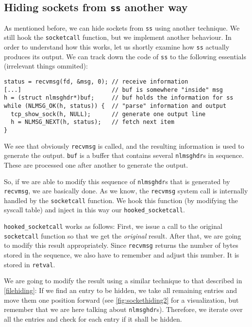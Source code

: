 \documentclass[10pt, letterpaper]{scrartcl}
\begin{document}
\subsection{Hiding sockets from \texttt{ss} another way}
\label{sec:socket-hiding-evasion}

As mentioned before, we can hide sockets from \texttt{ss} using another technique. We still hook the \texttt{socketcall} function, but we implement another behaviour. In order to understand how this works, let us shortly examine how \texttt{ss} actually produces its output. We can track down the code of \texttt{ss} to the following essentials (irrelevant things ommited):

\begin{verbatim}
status = recvmsg(fd, &msg, 0); // receive information
[...]                          // buf is somewhere "inside" msg
h = (struct nlmsghdr*)buf;     // buf holds the information for ss
while (NLMSG_OK(h, status)) {  // "parse" information and output
  tcp_show_sock(h, NULL);      // generate one output line
  h = NLMSG_NEXT(h, status);   // fetch next item
}
\end{verbatim}

We see that obviously \texttt{recvmsg} is called, and the resulting information is used to generate the output. \texttt{buf} is a buffer that contains several \texttt{nlmsghdr}s in sequence. These are processed one after another to generate the output.

So, if we are able to modify this sequence of \texttt{nlmsghdr}s that is generated by \texttt{recvmsg}, we are basically done. As we know, the \texttt{recvmsg} system call is internally handled by the \texttt{socketcall} function. We hook this function (by modifying the syscall table) and inject in this way our \texttt{hooked\_socketcall}. 

\texttt{hooked\_socketcall} works as follows: First, we issue a call to the original \texttt{socketcall} function so that we get the \emph{original} result. After that, we are going to modify this result appropriately. Since \texttt{recvmsg} returns the number of bytes stored in the sequence, we also have to remember and adjust this number. It is stored in \texttt{retval}.

We are going to modify the result using a similar technique to that described in \autoref{filehiding}: If we find an entry to be hidden, we take all remaining entries and move them one position forward (see \autoref{fig:sockethiding2} for a visualization, but remember that we are here talking about \texttt{nlmsghdr}s). Therefore, we iterate over all the entries and check for each entry if it shall be hidden.
\end{document}
